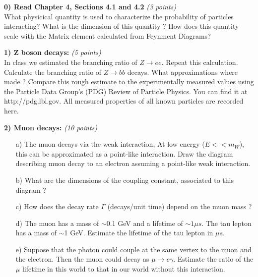 {\large

\textbf{0) Read Chapter 4, Sections 4.1 and 4.2 }\hfill \textit{(3 points)}\\
What physicical quantity is used to characterize the probability of particles interacting?
What is the dimension of this quantity ?
How does this quantity scale with the Matrix element calculated from Feynment Diagrams?


\textbf{1) Z boson decays: } \hfill \textit{(5 points)}\\
In class we estimated the branching ratio of $Z\rightarrow ee$.  
Repeat this calculation.
Calculate the branching ratio of $Z\rightarrow bb$ decays.
What approximations where made ?
Compare this rough estimate to the experimentally measured values using the Particle Data Group's (PDG) Review of Particle Physics. 
You can find it at http://pdg.lbl.gov.
All measured properties of all known particles are recorded here.


\textbf{2) Muon decays: } \hfill \textit{(10 points)}
\begin{itemize}
  \item[a)]{ The muon decays via the weak interaction,  At low energy ($E << m_W$), this can be approximated as a point-like interaction. 
  Draw the diagram describing muon decay to an electron assuming a point-like weak interaction.
}
  \item[b)]{ What are the dimensions of the coupling constant, associated to this diagram  ?
  }
  \item[c)] How does the decay rate $\Gamma$ (decays/unit time)  depend on the muon mass ? 
  \item[d)]{ The muon has a mass of $\sim$0.1 GeV and a lifetime of $\sim 1 \mu s$. The tau lepton has a mass of {$\sim$1 GeV}. Estimate the lifetime of the tau lepton in $\mu s$.
}
  \item[e)] {Suppose that the photon could couple at the same vertex to the muon and the electron. Then the muon could decay as $\mu\rightarrow e \gamma$. 
  Estimate the ratio of the $\mu$ lifetime in this world to that in our world without this interaction.
  }
\end{itemize}



\vspace*{0.25in}

}
